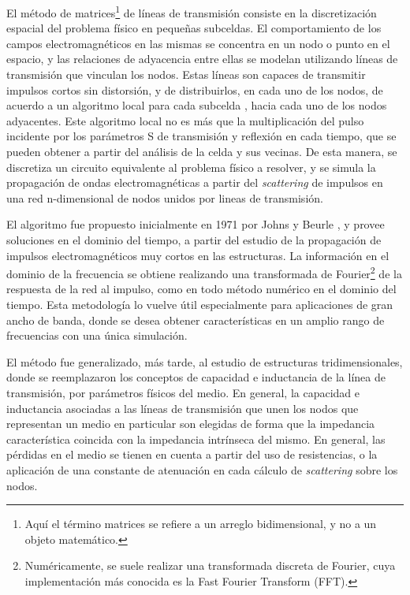 El método de matrices\footnote{Aquí el término matrices se refiere a un arreglo bidimensional, y no a un objeto matemático.} de líneas de transmisión consiste en la discretización espacial del problema físico en pequeñas subceldas. El comportamiento de los campos electromagnéticos en las mismas se concentra en un nodo o punto en el espacio, y las relaciones de adyacencia entre ellas se modelan utilizando líneas de transmisión que vinculan los nodos. Estas líneas son capaces de transmitir impulsos cortos sin distorsión, y de distribuirlos, en cada uno de los nodos, de acuerdo a un algoritmo local para cada subcelda \cite{Caloz:ElectromagneticMetamaterials}, hacia cada uno de los nodos adyacentes. Este algoritmo local no es más que la multiplicación del pulso incidente por los parámetros S de transmisión y reflexión en cada tiempo, que se pueden obtener a partir del análisis de la celda y sus vecinas. De esta manera, se discretiza un circuito equivalente al problema físico a resolver, y se simula la propagación de ondas electromagnéticas a partir del \textit{scattering} de impulsos en una red n-dimensional de nodos unidos por lineas de transmisión.

El algoritmo fue propuesto inicialmente en 1971 por Johns y Beurle \cite{JohnsBeurle:TLM}, y provee soluciones en el dominio del tiempo, a partir del estudio de la propagación de impulsos electromagnéticos muy cortos en las estructuras. La información en el dominio de la frecuencia se obtiene realizando una transformada de Fourier\footnote{Numéricamente, se suele realizar una transformada discreta de Fourier, cuya implementación más conocida es la Fast Fourier Transform (FFT).} de la respuesta de la red al impulso, como en todo método numérico en el dominio del tiempo. Esta metodología lo vuelve útil especialmente para aplicaciones de gran ancho de banda, donde se desea obtener características en un amplio rango de frecuencias con una única simulación.

El método fue generalizado, más tarde, al estudio de estructuras tridimensionales, donde se reemplazaron los conceptos de capacidad e inductancia de la línea de transmisión, por parámetros físicos del medio. En general, la capacidad e inductancia asociadas a las líneas de transmisión que unen los nodos que representan un medio en particular son elegidas de forma que la impedancia característica coincida con la impedancia intrínseca del mismo. En general, las pérdidas en el medio se tienen en cuenta a partir del uso de resistencias, o la aplicación de una constante de atenuación en cada cálculo de \textit{scattering} sobre los nodos.



